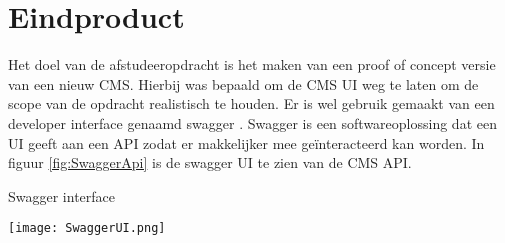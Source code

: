 \section{Eindproduct}
\label{section:Eindproduct}
Het doel van de afstudeeropdracht is het maken van een proof of concept versie van een nieuw CMS.
Hierbij was bepaald om de CMS UI weg te laten om de scope van de opdracht realistisch te houden.
Er is wel gebruik gemaakt van een developer interface genaamd swagger \parencite{Swagger}.
Swagger is een softwareoplossing dat een UI geeft aan een API zodat er makkelijker mee geïnteracteerd kan worden.
In figuur \ref{fig:SwaggerApi} is de swagger UI te zien van de CMS API.

\whitespace
\begin{graphic}
    \captionsetup{type=figure}
    \caption{Swagger interface}
    \texttt{[image: SwaggerUI.png]}
    \label{fig:SwaggerApi}
\end{graphic}




